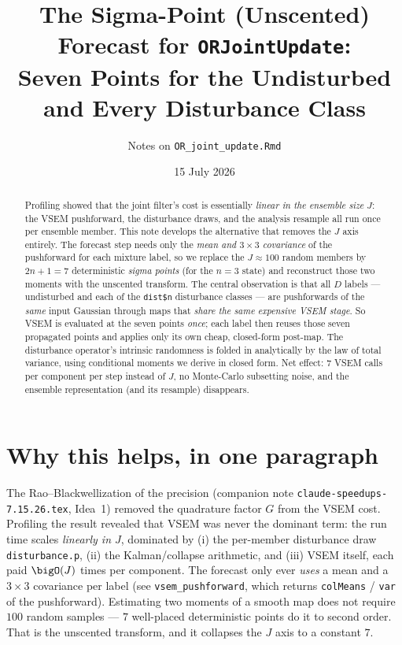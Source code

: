 \documentclass[11pt]{article}
\title{The Sigma-Point (Unscented) Forecast for \texttt{ORJointUpdate}:\\
Seven Points for the Undisturbed and Every Disturbance Class}
\author{Notes on \texttt{OR\_joint\_update.Rmd}}
\date{15 July 2026}
\newcommand{\code}[1]{\texttt{#1}}
\begin{document}
\maketitle

\begin{abstract}
Profiling showed that the joint filter's cost is essentially \emph{linear in the
ensemble size} $J$: the VSEM pushforward, the disturbance draws, and the analysis
resample all run once per ensemble member. This note develops the alternative that
removes the $J$ axis entirely. The forecast step needs only the \emph{mean and
$3\times3$ covariance} of the pushforward for each mixture label, so we replace the
$J\!\approx\!100$ random members by $2n+1=7$ deterministic \emph{sigma points} (for the
$n=3$ state) and reconstruct those two moments with the unscented transform. The central
observation is that all $D$ labels --- undisturbed and each of the \code{dist\$n}
disturbance classes --- are pushforwards of the \emph{same} input Gaussian through maps
that \emph{share the same expensive VSEM stage}. So VSEM is evaluated at the seven points
\emph{once}; each label then reuses those seven propagated points and applies only its own
cheap, closed-form post-map. The disturbance operator's intrinsic randomness is folded in
analytically by the law of total variance, using conditional moments we derive in closed
form. Net effect: $7$ VSEM calls per component per step instead of $J$, no Monte-Carlo
subsetting noise, and the ensemble representation (and its resample) disappears.
\end{abstract}

\tableofcontents

\section{Why this helps, in one paragraph}
\label{sec:why}

The Rao--Blackwellization of the precision (companion note
\code{claude-speedups-7.15.26.tex}, Idea~1) removed the quadrature factor $G$ from the
VSEM cost. Profiling the result revealed that VSEM was never the dominant term: the run
time scales \emph{linearly in $J$}, dominated by (i) the per-member disturbance draw
\code{disturbance.p}, (ii) the Kalman/collapse arithmetic, and (iii) VSEM itself, each
paid $\bigO(J)$ times per component. The forecast only ever \emph{uses} a mean and a
$3\times3$ covariance per label (see \code{vsem\_pushforward}, which returns
\code{colMeans} / \code{var} of the pushforward). Estimating two moments of a smooth map
does not require $100$ random samples --- $7$ well-placed deterministic points do it to
second order. That is the unscented transform, and it collapses the $J$ axis to a
constant $7$.
\end{document}
